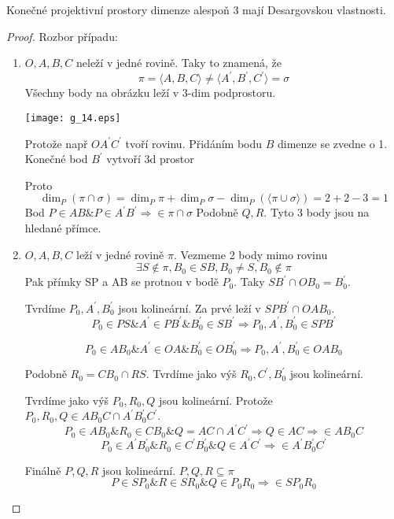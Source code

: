 \begin{theorem}
    Konečné projektivní prostory dimenze alespoň 3 mají Desargovskou vlastnosti.
\end{theorem}
\begin{proof}
	Rozbor případu:
	\begin{enumerate}
		\item $O, A, B, C$ neleží v jedné rovině.
			Taky to znamená, že
			\[ \pi = \langle A, B, C \rangle \ne \langle A^{\prime}, B^{\prime}, C^{\prime} \rangle = \sigma \]
			Všechny body na obrázku leží v 3-dim podprostoru.

    	\texttt{[image: g\_14.eps]}

	Protože např $OA^{\prime}C^{\prime}$ tvoří rovinu.
	Přidáním bodu $B$ dimenze se zvedne o 1.
	Konečné bod $B^{\prime}$ vytvoří 3d prostor

	Proto
	\[ \dim_P(\pi \cap \sigma) = \dim_P \pi + \dim_P \sigma - \dim_P(\langle \pi \cup \sigma \rangle) = 2 + 2 - 3 = 1 \]
	Bod $P \in AB \& P \in A^{\prime}B^{\prime} \Rightarrow \in \pi \cap \sigma$
	Podobně $Q, R$.
	Tyto 3 body jsou na hledané přímce.
		\item $O, A, B, C$ leží v jedné rovině $\pi$.
			Vezmeme 2 body mimo rovinu
			\[ \exists S \notin \pi, B_0 \in SB, B_0 \ne S, B_0 \notin \pi \]
			Pak přímky SP a AB se protnou v bodě $P_0$.
			Taky $SB^{\prime} \cap OB_0 = B_0^{\prime}$.

			Tvrdíme $P_0, A^{\prime}, B_0^{\prime}$ jsou kolineární.
			Za prvé leží v $SPB^{\prime} \cap OAB_0$.
			\[ P_0 \in PS \& A^{\prime} \in PB^{\prime} \& B_0^{\prime} \in SB^{\prime} \Rightarrow P_0, A^{\prime}, B_0^{\prime} \in SPB^{\prime} \]

			\[ P_0 \in AB_0 \& A^{\prime} \in OA \& B_0^{\prime} \in OB_0^{\prime} \Rightarrow P_0, A^{\prime}, B_0^{\prime} \in OAB_0 \]

			Podobně $R_0 = CB_0 \cap RS$.
			Tvrdíme jako výš $R_0, C^{\prime}, B_0^{\prime}$ jsou kolineární.

			Tvrdíme jako výš $P_0, R_0, Q$ jsou kolineární.
			Protože $P_0, R_0, Q \in AB_0C \cap A^{\prime}B_0^{\prime}C^{\prime}$.
			\[ P_0 \in AB_0 \& R_0 \in CB_0 \& Q = AC \cap A^{\prime}C^{\prime} \Rightarrow Q \in AC \Rightarrow \in AB_0C \]
			\[ P_0 \in A^{\prime}B_0^{\prime} \& R_0 \in C^{\prime}B_0^{\prime} \& Q \in A^{\prime}C^{\prime} \Rightarrow \in A^{\prime}B_0^{\prime}C^{\prime} \]

			Finálně $P, Q, R$ jsou kolineární.
			$P, Q, R \subseteq \pi$
			\[ P \in SP_0 \& R \in SR_0 \& Q \in P_0R_0 \Rightarrow \in SP_0R_0 \]
	\end{enumerate}
\end{proof}

